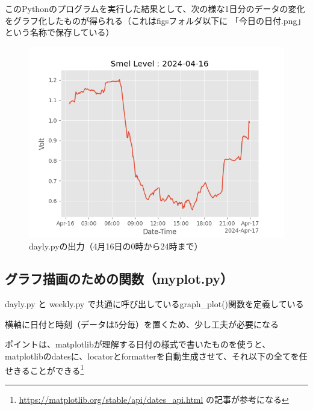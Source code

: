 \documentclass[12pt,a4paper,uplatex]{jsarticle}
\begin{document}
\newpage

このPythonのプログラムを実行した結果として、次の様な1日分のデータの変化をグラフ化したものが得られる（これはfigsフォルダ以下に 「今日の日付.png」 という名称で保存している）

\begin{figure}[htbp]
	\begin{minipage}[b]{1.0\linewidth}
		\centering
		\includegraphics[keepaspectratio, scale=0.8]{figs/png/2024-04-16.png}
		\caption{dayly.pyの出力（4月16日の0時から24時まで）}
	\end{minipage}
\end{figure}

\subsection{グラフ描画のための関数（myplot.py）}

dayly.py と weekly.py で共通に呼び出しているgraph\_plot()関数を定義している

横軸に日付と時刻（データは5分毎）を置くため、少し工夫が必要になる

ポイントは、matplotlibが理解する日付の様式で書いたものを使うと、matplotlibのdatesに、locatorとformatterを自動生成させて、それ以下の全てを任せきることができる\footnote{\url{https://matplotlib.org/stable/api/dates_api.html}
	の記事が参考になる}
\end{document}
